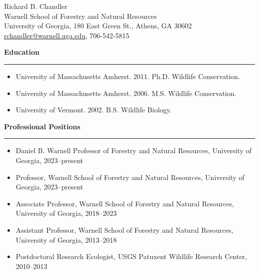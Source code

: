\documentclass[12pt]{article}
\begin{document}
\flushleft

% 

\singlespacing
\thispagestyle{plain} %

\begin{center}
{\large Richard B. Chandler} \\
Warnell School of Forestry and Natural Resources \\ %
University of Georgia, %
180 East Green St., Athens, GA 30602 \\
\href{mailto:rchandler@warnell.uga.edu}{rchandler@warnell.uga.edu},  %
706-542-5815 \\
\end{center}


\vspace{0.8cm}

{\large \bf Education} \\
\rule[3mm]{\textwidth}{0.3mm}

\begin{itemize}
    \item \textnormal{University of Massachusetts Amherst}. 2011. Ph.D. Wildlife Conservation. 
    \item \textnormal{University of Massachusetts Amherst}. 2006. M.S. Wildlife Conservation. 
    \item \textnormal{University of Vermont}. 2002. B.S. Wildlife Biology. 
\end{itemize}


\vspace{0.5cm}

{\large \bf Professional Positions} \\
\rule[3mm]{\textwidth}{0.3mm}

\begin{itemize}

\item Daniel B. Warnell Professor of Forestry and Natural
  Resources, University of Georgia, 2023--present 

\item \textnormal{Professor}, Warnell School of Forestry and
  Natural Resources, University of Georgia, 2023--present

\item \textnormal{Associate Professor}, Warnell School of Forestry and
  Natural Resources, University of Georgia, 2018--2023

\item \textnormal{Assistant Professor}, Warnell School of Forestry and
  Natural Resources, University of Georgia, 2013--2018
  
\item \textnormal{Postdoctoral Research Ecologist}, USGS Patuxent
  Wildlife Research Center, 2010--2013

\end{itemize}
\end{document}
